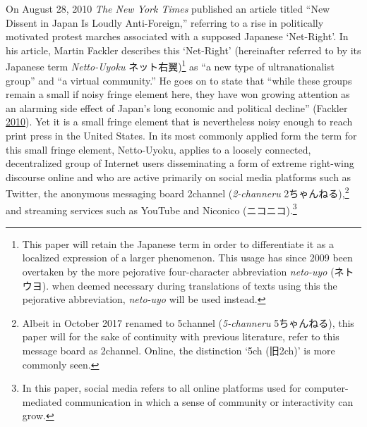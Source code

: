 \documentclass[10pt,british,A4paper,twoside]{memoir}
\begin{document}
On August 28, 2010 \emph{The New York Times} published an article titled
``New Dissent in Japan Is Loudly Anti-Foreign,'' referring to a rise in
politically motivated protest marches associated with a supposed
Japanese `Net-Right'. In his article, Martin Fackler describes this
`Net-Right' (hereinafter referred to by its Japanese term
\emph{Netto-Uyoku} ネット右翼)\footnote{This paper will retain the
  Japanese term in order to differentiate it as a localized expression
  of a larger phenomenon. This usage has since 2009 been overtaken by
  the more pejorative four-character abbreviation \emph{neto-uyo}
  (ネトウヨ). when deemed necessary during translations of texts using
  this the pejorative abbreviation, \emph{neto-uyo} will be used
  instead.} as ``a new type of ultranationalist group'' and ``a virtual
community.'' He goes on to state that ``while these groups remain a
small if noisy fringe element here, they have won growing attention as
an alarming side effect of Japan's long economic and political decline''
(Fackler \protect\hyperlink{ref-fackler_new_2010-1}{2010}). Yet it is a
small fringe element that is nevertheless noisy enough to reach print
press in the United States. In its most commonly applied form the term for this small fringe element,
Netto-Uyoku, applies to a loosely connected, decentralized group of
Internet users disseminating a form of extreme right-wing discourse
online and who are active primarily on social media platforms such as
Twitter, the anonymous messaging board 2channel (\emph{2-channeru}
2ちゃんねる),\footnote{Albeit in October 2017 renamed to 5channel
  (\emph{5-channeru} 5ちゃんねる), this paper will for the sake of
  continuity with previous literature, refer to this message board as
  2channel. Online, the distinction `5ch (旧2ch)' is more commonly seen.}
and streaming services such as YouTube and Niconico
(ニコニコ).\footnote{In this paper, social media refers to all online
  platforms used for computer-mediated communication in which a sense of
  community or interactivity can grow.}
\end{document}

